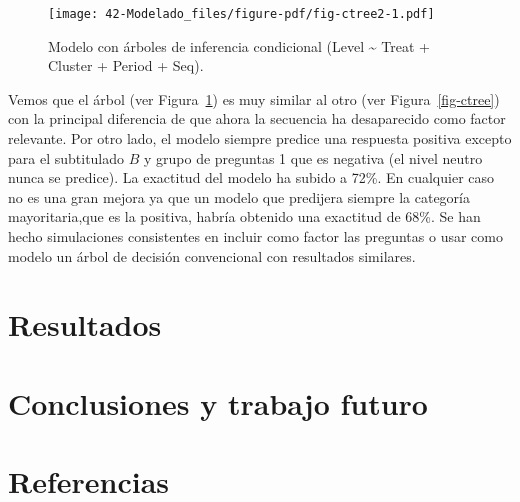 \documentclass[
  12pt,
  a4paper,
  extrafontsizes,
  onecolumn,
  openright]{memoir}
\begin{document}
\normalsize

\begin{figure}[h]

{\centering \texttt{[image: 42-Modelado\_files/figure-pdf/fig-ctree2-1.pdf]}

}

\caption{\label{fig-ctree2}Modelo con árboles de inferencia condicional
(Level \textasciitilde{} Treat + Cluster + Period + Seq).}

\end{figure}

Vemos que el árbol (ver Figura~\ref{fig-ctree2}) es muy similar al otro
(ver Figura~\ref{fig-ctree}) con la principal diferencia de que ahora la
secuencia ha desaparecido como factor relevante. Por otro lado, el
modelo siempre predice una respuesta positiva excepto para el
subtitulado \(B\) y grupo de preguntas 1 que es negativa (el nivel
neutro nunca se predice). La exactitud del modelo ha subido a 72\%. En
cualquier caso no es una gran mejora ya que un modelo que predijera
siempre la categoría mayoritaria,que es la positiva, habría obtenido una
exactitud de 68\%. Se han hecho simulaciones consistentes en incluir
como factor las preguntas o usar como modelo un árbol de decisión
convencional con resultados similares.


\hypertarget{resultados}{%
\chapter{Resultados}\label{resultados}}


\hypertarget{conclusiones}{%
\chapter{Conclusiones y trabajo futuro}\label{conclusiones}}


\hypertarget{referencias}{%
\chapter*{Referencias}\label{referencias}}


\printbibliography[heading=none]

\cleardoublepage
{}
{}
\appendix
\end{document}
